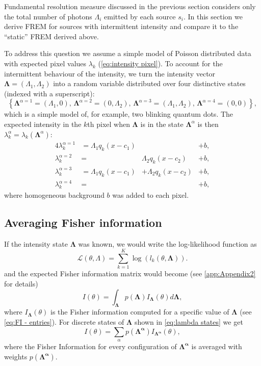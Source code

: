 Fundamental resolution measure discussed in the previous section considers only the total number of photons $\Lambda_i$ emitted by each source $s_i$. In this section we derive FREM for sources with intermittent intensity and compare it to the ``static'' FREM derived above. 

To address this question we assume a simple model of Poisson distributed data with expected pixel values $\lambda_k$ (\autoref{eq:intensity pixel}). To account for the intermittent behaviour of the intensity, we turn the intensity vector $\bm{\Lambda}=(\Lambda_1,\Lambda_2)$ into a random variable distributed over four distinctive states (indexed with a superscript):
%
\begin{equation}
	\left\{ \bm{\Lambda}^{\alpha=1}=(\Lambda_1,0),\,\bm{\Lambda}^{\alpha=2}=(0,\Lambda_2),\,\bm{\Lambda}^{\alpha=3}=(\Lambda_1,\Lambda_2),\,\bm{\Lambda}^{\alpha=4}=(0,0)\right\},
	\label{eq:intensity states}
\end{equation}
%
which is a simple model of, for example, two blinking quantum dots. The expected intensity in the $k$th pixel when $\bm{\Lambda}$ is in the state $\bm{\Lambda}^\alpha$ is then $\lambda_k^\alpha=\lambda_k(\bm{\Lambda}^\alpha)$:
%
\begin{alignat}{4}
	\lambda_k^{\alpha=1}&=\Lambda_1q_k(x-c_1) & &+b,\nonumber\\ 
	\lambda_k^{\alpha=2}&=&\Lambda_2q_k(x-c_2) &+b,\nonumber\\ 
	\lambda_k^{\alpha=3}&=\Lambda_1q_k(x-c_1)&+\Lambda_2q_k(x-c_2)&+b,\nonumber\\ 
	\lambda_k^{\alpha=4}&=& &+b,
	\label{eq:lambda states}
\end{alignat}
%
where homogeneous background $b$ was added to each pixel.

\subsection{Averaging Fisher information\label{sub:avg FI}}
If the intensity state $\bm{\Lambda}$ was known, we would write the log-likelihood function as 
%
\begin{equation}
	\mathcal{L}(\theta,\Lambda)=\sum_{k=1}^K\log\left(l_k(\theta,\bm{\Lambda})\right).
\end{equation}
%
and the expected Fisher information matrix would become (see \autoref{app:Appendix2} for details)
%
\begin{equation*}
	I(\theta) = \int_{\bm{\Lambda}}p(\bm{\Lambda})I_{\bm{\Lambda}}(\theta)d\bm{\Lambda},
\end{equation*}
%
where $I_{\bm{\Lambda}}(\theta)$ is the Fisher information computed for a specific value of $\bm{\Lambda}$ (see \autoref{eq:FI - entries}).
%
For discrete states of $\bm{\Lambda}$ shown in \autoref{eq:lambda states} we get
%
\begin{equation}
	I(\theta)=\sum_{\alpha}p(\bm{\Lambda^\alpha})I_{\bm{\Lambda^\alpha}}(\theta),
	\label{eq:FI avg}
\end{equation}
%
where the Fisher Information for every configuration of $\bm{\Lambda^\alpha}$ is averaged with weights $p(\bm{\Lambda^\alpha})$. 


